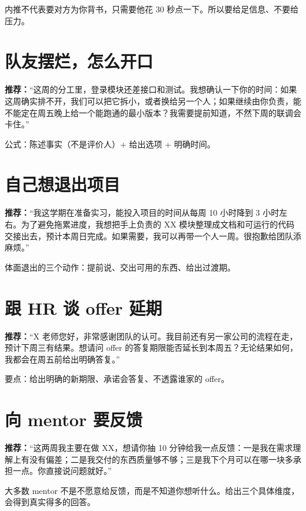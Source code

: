 \documentclass[UTF8,zihao=5,openany]{ctexbook}
\begin{document}
内推不代表要对方为你背书，只需要他花 30 秒点一下。所以要给足信息、不要给压力。

\section{队友摆烂，怎么开口}
\begin{casebox}
\textbf{推荐：}“这周的分工里，登录模块还差接口和测试。我想确认一下你的时间：如果这周确实排不开，我们可以把它拆小，或者换给另一个人；如果继续由你负责，能不能定在周五晚上给一个能跑通的最小版本？我需要提前知道，不然下周的联调会卡住。”
\end{casebox}

公式：陈述事实（不是评价人）+ 给出选项 + 明确时间。

\section{自己想退出项目}
\begin{casebox}
\textbf{推荐：}“我这学期在准备实习，能投入项目的时间从每周 10 小时降到 3 小时左右。为了避免拖累进度，我想把手上负责的 XX 模块整理成文档和可运行的代码交接出去，预计本周日完成。如果需要，我可以再带一个人一周。很抱歉给团队添麻烦。”
\end{casebox}

体面退出的三个动作：提前说、交出可用的东西、给出过渡期。

\section{跟 HR 谈 offer 延期}
\begin{casebox}
\textbf{推荐：}“X 老师您好，非常感谢团队的认可。我目前还有另一家公司的流程在走，预计下周三有结果。想请问 offer 的答复期限能否延长到本周五？无论结果如何，我都会在周五前给出明确答复。”
\end{casebox}

要点：给出明确的新期限、承诺会答复、不透露谁家的 offer。

\section{向 mentor 要反馈}
\begin{casebox}
\textbf{推荐：}“这两周我主要在做 XX，想请你抽 10 分钟给我一点反馈：一是我在需求理解上有没有偏差；二是我交付的东西质量够不够；三是我下个月可以在哪一块多承担一点。你直接说问题就好。”
\end{casebox}

大多数 mentor 不是不愿意给反馈，而是不知道你想听什么。给出三个具体维度，会得到真实得多的回答。
\end{document}
